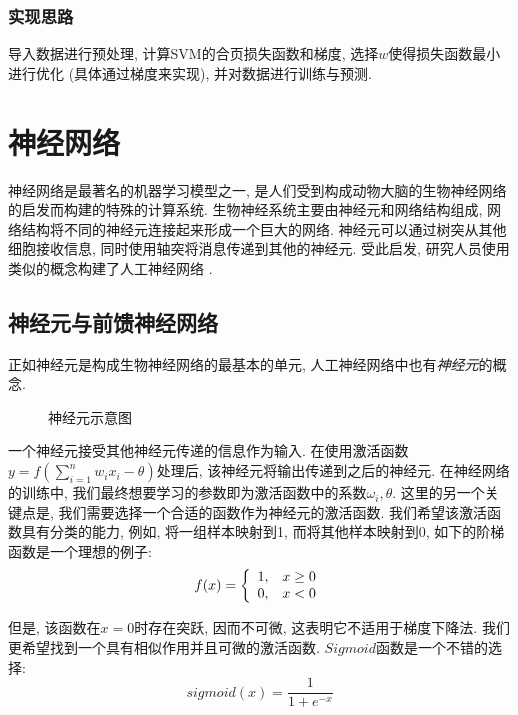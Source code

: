 \documentclass[lang=cn, 11pt,   a4paper]{elegantpaper}
\begin{document}
\subsubsection{实现思路}
导入数据进行预处理, 计算SVM的合页损失函数和梯度, 选择$w$使得损失函数最小进行优化 (具体通过梯度来实现), 并对数据进行训练与预测. 


\section{神经网络}
神经网络是最著名的机器学习模型之一, 是人们受到构成动物大脑的生物神经网络的启发而构建的特殊的计算系统. 生物神经系统主要由神经元和网络结构组成, 网络结构将不同的神经元连接起来形成一个巨大的网络. 神经元可以通过树突从其他细胞接收信息, 同时使用轴突将消息传递到其他的神经元. 受此启发, 研究人员使用类似的概念构建了人工神经网络 \cite{周16}. 
\subsection{神经元与前馈神经网络}

正如神经元是构成生物神经网络的最基本的单元, 人工神经网络中也有\textit{神经元}的概念.
\begin{figure}[h]
\caption{神经元示意图}
\end{figure}

一个神经元接受其他神经元传递的信息作为输入. 在使用激活函数$y = f \left ( \sum _ { i = 1 } ^ { n } w _ { i } x _ { i } - \theta \right)$处理后, 该神经元将输出传递到之后的神经元. 在神经网络的训练中, 我们最终想要学习的参数即为激活函数中的系数$\omega_i, \theta$. 这里的另一个关键点是, 我们需要选择一个合适的函数作为神经元的激活函数. 我们希望该激活函数具有分类的能力, 例如, 将一组样本映射到1, 而将其他样本映射到0, 如下的阶梯函数是一个理想的例子:  
$$
{ f } ( x ) = \left\{ \begin{array} { l l } { 1, } & { x \geq 0 } \\ { 0, } & { x < 0 } \end{array} \right.
$$

但是, 该函数在$x=0$时存在突跃, 因而不可微, 这表明它不适用于梯度下降法. 我们更希望找到一个具有相似作用并且可微的激活函数. $Sigmoid$函数是一个不错的选择: 
\begin{equation}
 { sigmoid } ( x ) = \frac { 1 } { 1 + e ^ { - x } }
\end{equation}
\end{document}
